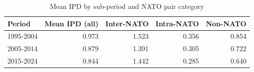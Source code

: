 \begin{table}[!h]
\centering
\caption{\label{tab:tab:ipd_period_nato}Mean IPD by sub-period and NATO pair category}
\centering
\begin{tabular}[t]{lrrrr}
\toprule
Period & Mean IPD (all) & Inter-NATO & Intra-NATO & Non-NATO\\
\midrule
1995-2004 & 0.973 & 1.523 & 0.356 & 0.854\\
2005-2014 & 0.879 & 1.391 & 0.305 & 0.722\\
2015-2024 & 0.844 & 1.442 & 0.285 & 0.640\\
\bottomrule
\end{tabular}
\end{table}
